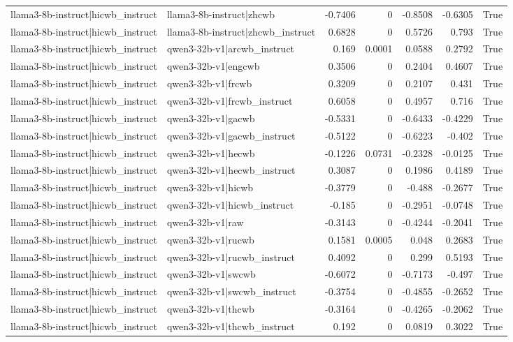 \begin{table}
\begin{tabular}{l l r r r r l}
llama3-8b-instruct|hicwb_instruct & llama3-8b-instruct|zhcwb & -0.7406 & 0 & -0.8508 & -0.6305 & True \\
llama3-8b-instruct|hicwb_instruct & llama3-8b-instruct|zhcwb_instruct & 0.6828 & 0 & 0.5726 & 0.793 & True \\
llama3-8b-instruct|hicwb_instruct & qwen3-32b-v1|arcwb_instruct & 0.169 & 0.0001 & 0.0588 & 0.2792 & True \\
llama3-8b-instruct|hicwb_instruct & qwen3-32b-v1|engcwb & 0.3506 & 0 & 0.2404 & 0.4607 & True \\
llama3-8b-instruct|hicwb_instruct & qwen3-32b-v1|frcwb & 0.3209 & 0 & 0.2107 & 0.431 & True \\
llama3-8b-instruct|hicwb_instruct & qwen3-32b-v1|frcwb_instruct & 0.6058 & 0 & 0.4957 & 0.716 & True \\
llama3-8b-instruct|hicwb_instruct & qwen3-32b-v1|gacwb & -0.5331 & 0 & -0.6433 & -0.4229 & True \\
llama3-8b-instruct|hicwb_instruct & qwen3-32b-v1|gacwb_instruct & -0.5122 & 0 & -0.6223 & -0.402 & True \\
llama3-8b-instruct|hicwb_instruct & qwen3-32b-v1|hecwb & -0.1226 & 0.0731 & -0.2328 & -0.0125 & True \\
llama3-8b-instruct|hicwb_instruct & qwen3-32b-v1|hecwb_instruct & 0.3087 & 0 & 0.1986 & 0.4189 & True \\
llama3-8b-instruct|hicwb_instruct & qwen3-32b-v1|hicwb & -0.3779 & 0 & -0.488 & -0.2677 & True \\
llama3-8b-instruct|hicwb_instruct & qwen3-32b-v1|hicwb_instruct & -0.185 & 0 & -0.2951 & -0.0748 & True \\
llama3-8b-instruct|hicwb_instruct & qwen3-32b-v1|raw & -0.3143 & 0 & -0.4244 & -0.2041 & True \\
llama3-8b-instruct|hicwb_instruct & qwen3-32b-v1|rucwb & 0.1581 & 0.0005 & 0.048 & 0.2683 & True \\
llama3-8b-instruct|hicwb_instruct & qwen3-32b-v1|rucwb_instruct & 0.4092 & 0 & 0.299 & 0.5193 & True \\
llama3-8b-instruct|hicwb_instruct & qwen3-32b-v1|swcwb & -0.6072 & 0 & -0.7173 & -0.497 & True \\
llama3-8b-instruct|hicwb_instruct & qwen3-32b-v1|swcwb_instruct & -0.3754 & 0 & -0.4855 & -0.2652 & True \\
llama3-8b-instruct|hicwb_instruct & qwen3-32b-v1|thcwb & -0.3164 & 0 & -0.4265 & -0.2062 & True \\
llama3-8b-instruct|hicwb_instruct & qwen3-32b-v1|thcwb_instruct & 0.192 & 0 & 0.0819 & 0.3022 & True \\

\end{tabular}
\end{table}
